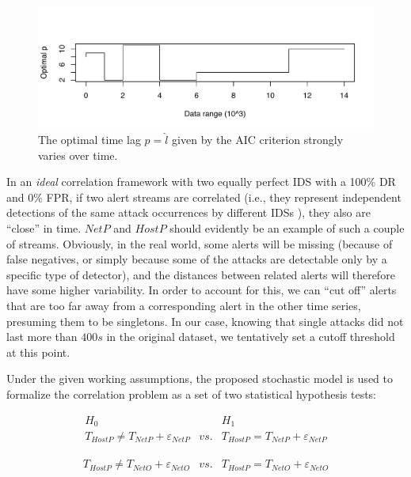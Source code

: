 \begin{figure}[t]
  \centering
  \includegraphics[width=\textwidth]{figures/correlation/causality/p-does-vary}
  \caption{The optimal time lag $p = \hat{l}$ given by the \ac{AIC}
    criterion strongly varies over time.}
  \label{fig:p-does-vary}
\end{figure}

In an \emph{ideal} correlation framework with two equally perfect \ac{IDS} with a 100\% \ac{DR} and 0\% \ac{FPR}, if two alert streams are correlated (i.e., they represent independent detections of the same attack occurrences by different \acp{IDS} \citep{valeur04comprehensive}), they also are ``close'' in time. $NetP$ and $HostP$ should evidently be an example of such a couple of streams. Obviously, in the real world, some alerts will be missing (because of false negatives, or simply because some of the attacks are detectable only by a specific type of detector), and the distances between related alerts will therefore have some higher variability. In order to account for this, we can ``cut off'' alerts that are too far away from a corresponding alert in the other time series, presuming them to be singletons. In our case, knowing that single attacks did not last more than $400 s$ in the original dataset, we tentatively set a cutoff threshold at this point.

Under the given working assumptions, the proposed stochastic model is used to formalize the correlation problem as a set of two statistical hypothesis tests:

\begin{equation}\label{eq:hp-test-1}
  \begin{array}{ccc}
    H_{0} && H_{1}\\
    T_{HostP} \neq T_{NetP} + \varepsilon_{NetP} &vs.& T_{HostP} = T_{NetP} + \varepsilon_{NetP}
  \end{array}
\end{equation}

\begin{equation}\label{eq:hp-test-2}
  \begin{array}{ccc}
    T_{HostP} \neq T_{NetO} + \varepsilon_{NetO} &vs.& T_{HostP} = T_{NetO} + \varepsilon_{NetO}
  \end{array}
\end{equation}

